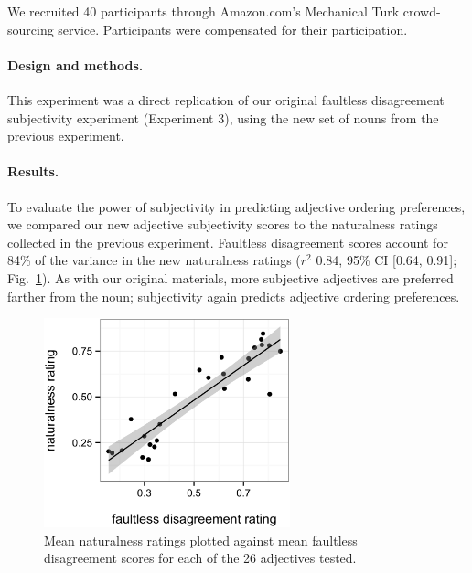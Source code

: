 \documentclass[12pt]{article}
\begin{document}
We recruited 40 participants through Amazon.com's Mechanical Turk crowd-sourcing service. Participants were compensated for their participation.

\paragraph{Design and methods.}

This experiment was a direct replication of our original faultless disagreement subjectivity experiment (Experiment 3), using the new set of nouns from the previous experiment.

\paragraph{Results.}

To evaluate the power of subjectivity in predicting adjective ordering preferences, we compared our new adjective subjectivity scores to the naturalness ratings collected in the previous experiment. 
Faultless disagreement scores account for  84\% of the variance in the new naturalness ratings ($r^2$ 0.84, 95\% CI [0.64,  0.91]; Fig.~\ref{fig:faultless}). 
As with our original materials, more subjective adjectives are preferred farther from the noun; subjectivity again predicts adjective ordering preferences.


\renewcommand\thefigure{S.\arabic{figure}}
\begin{figure}
	\centering\includegraphics[width=2.8in]{plots/naturalness-faultless-new-nouns.eps}
	\caption{Mean naturalness ratings plotted against mean faultless disagreement scores for each of the 26 adjectives tested.}\label{fig:faultless}
\end{figure}
\end{document}
